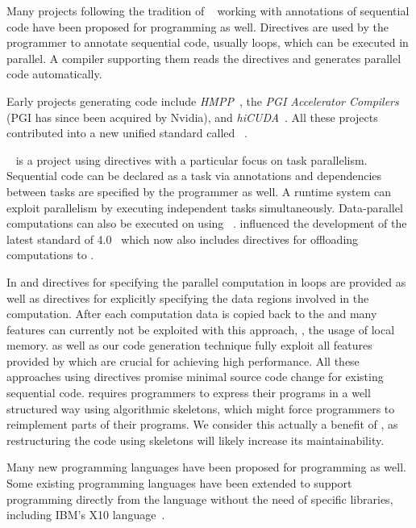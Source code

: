 \bigskip

Many projects following the tradition of \emph{\OpenMP}~\cite{OpenMP} working with annotations of sequential code have been proposed for \GPU programming as well.
Directives are used by the programmer to annotate sequential code, usually loops, which can be executed in parallel.
A compiler supporting them reads the directives and generates parallel code automatically.

Early projects generating \GPU code include \emph{HMPP}~\cite{DolbeauBiBo2007}, the \emph{PGI Accelerator Compilers} (PGI has since been acquired by Nvidia), and \emph{hiCUDA}~\cite{HanA11}.
All these projects contributed into a new unified standard called \emph{\OpenACC}~\cite{OpenACC}.

\emph{\OmpSs}~\cite{ElangovanBP12,DuranABLMMP11} is a project using directives with a particular focus on task parallelism.
Sequential code can be declared as a task via annotations and dependencies between tasks are specified by the programmer as well.
A runtime system can exploit parallelism by executing independent tasks simultaneously.
Data-parallel computations can also be executed on \GPUs using \OpenCL~\cite{ElangovanBP12}.
\OmpSs influenced the development of the latest standard of \emph{\OpenMP} 4.0~\cite{OpenMP} which now also includes directives for offloading computations to \GPUs.

In \OpenACC and  directives for specifying the parallel computation in loops are provided as well as directives for explicitly specifying the data regions involved in the computation.
After each computation data is copied back to the \CPU and many \GPU features can currently not be exploited with this approach, \eg, the usage of local memory.
\SkelCL as well as our code generation technique fully exploit all features provided by \GPUs which are crucial for achieving high performance.
All these approaches using directives promise minimal source code change for existing sequential code.
\SkelCL requires programmers to express their programs in a well structured way using algorithmic skeletons, which might force programmers to reimplement parts of their programs.
We consider this actually a benefit of \SkelCL, as restructuring the code using skeletons will likely increase its maintainability.

\bigskip

Many new programming languages have been proposed for \GPU programming as well.
Some existing programming languages have been extended to support \GPU programming directly from the language without the need of specific libraries, including IBM's X10 language~\cite{TakeuchiMaKaHoSuSuOn2011}.

